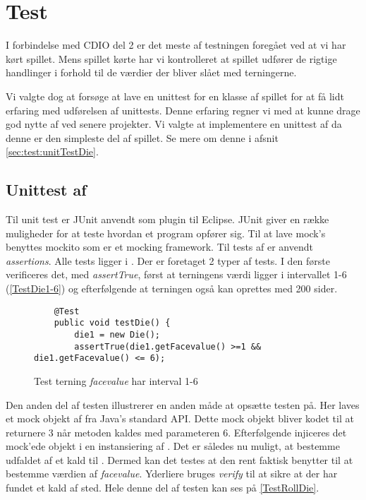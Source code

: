 \chapter{Test}\label{chap:test}
I forbindelse med CDIO del 2 er det meste af testningen foregået ved at vi har kørt spillet. Mens spillet kørte har vi kontrolleret at spillet udfører de rigtige handlinger i forhold til de værdier der bliver slået med terningerne.

Vi valgte dog at forsøge at lave en unittest for en klasse af spillet for at få lidt erfaring med udførelsen af unittests. Denne erfaring regner vi med at kunne drage god nytte af ved senere projekter. Vi valgte at implementere en unittest af  da denne er den simpleste del af spillet. Se mere om denne i afsnit \vref{sec:test:unitTestDie}.

\section{Unittest af }\label{sec:test:unitTestDie}
Til unit test er JUnit anvendt som plugin til Eclipse. JUnit giver en række muligheder for at teste hvordan et program opfører sig. Til at lave mock's benyttes mockito som er et mocking framework. Til tests af  er anvendt \textit{assertions}. Alle tests ligger i . Der er foretaget 2 typer af tests. I den første verificeres det, med \textit{assertTrue}, først at terningens værdi ligger i intervallet 1-6 (\vref{TestDie1-6}) og efterfølgende at terningen også kan oprettes med 200 sider. 

\begin{figure}
	\caption{Test terning \textit{facevalue} har interval 1-6}
	\label{TestDie1-6}
	\begin{lstlisting}
   	@Test
	public void testDie() {
		die1 = new Die();
		assertTrue(die1.getFacevalue() >=1 && die1.getFacevalue() <= 6);
    \end{lstlisting}
\end{figure}   

Den anden del af testen illustrerer en anden måde at opsætte testen på. Her laves et mock objekt af  fra Java's standard API. Dette mock objekt bliver kodet til at returnere 3 når metoden  kaldes med parameteren 6. Efterfølgende injiceres det mock'ede objekt i en instansiering af . Det er således nu muligt, at bestemme udfaldet af et kald til . Dermed kan det testes at den  rent faktisk benytter  til at bestemme værdien af \textit{facevalue}. Yderliere bruges \textit{verify} til at sikre at der har fundet et kald af  sted. Hele denne del af testen kan ses på \vref{TestRollDie}.

